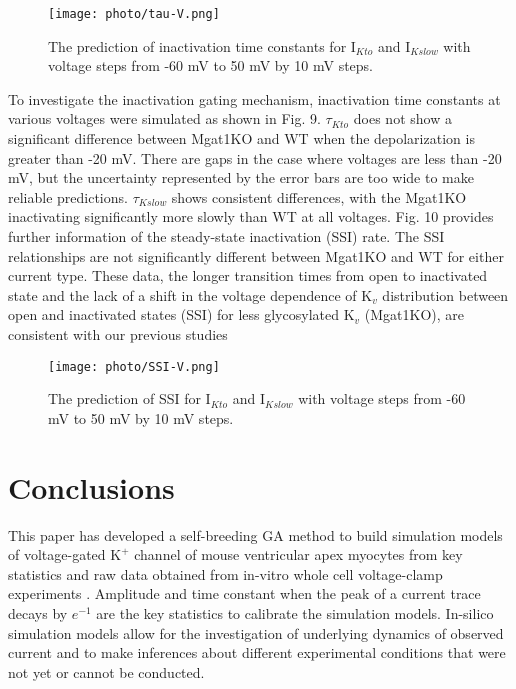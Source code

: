 \documentclass[journal]{IEEEtran}
\begin{document}
\begin{figure}
    \label{fign 9}
    \centering
    \texttt{[image: photo/tau-V.png]}
    \caption{The prediction of inactivation time constants for $\text{I}_{Kto}$ and $\text{I}_{Kslow}$ with voltage steps from -60 mV to 50 mV by 10 mV steps.} 
\end{figure}
To investigate the inactivation gating mechanism, inactivation time constants at various voltages were simulated as shown in Fig. 9. $\tau_{Kto}$ does not show a significant difference between Mgat1KO and WT when the depolarization is greater than -20 mV. There are gaps in the case where voltages are less than -20 mV, but the uncertainty represented by the error bars are too wide to make reliable predictions. $\tau_{Kslow}$ shows consistent differences, with the Mgat1KO inactivating significantly more slowly than WT at all voltages. Fig. 10 provides further information of the steady-state inactivation (SSI) rate. The SSI relationships are not significantly different between Mgat1KO and WT for either current type. These data, the longer transition times from open to inactivated state and the lack of a shift in the voltage dependence of $\text{K}_{v}$ distribution between open and inactivated states (SSI) for less glycosylated $\text{K}_{v}$ (Mgat1KO), are consistent with our previous studies \cite{schwetz2010n, ednie2015reduced, du2017}

\begin{figure}
    \label{fig 10}
    \centering
    \texttt{[image: photo/SSI-V.png]}
    \caption{The prediction of SSI for $\text{I}_{Kto}$ and $\text{I}_{Kslow}$ with voltage steps from -60 mV to 50 mV by 10 mV steps.} 
\end{figure}

\section{Conclusions}
This paper has developed a self-breeding GA method to build simulation models of voltage-gated $\text{K}^{+}$ channel of mouse ventricular apex myocytes from key statistics and raw data obtained from in-vitro whole cell voltage-clamp experiments \cite{ednie2019reduced}. Amplitude and time constant when the peak of a current trace decays by $e^{-1}$ are the key statistics to calibrate the simulation models. In-silico simulation models allow for the investigation of underlying dynamics of observed current and to make inferences about different experimental conditions that were not yet or cannot be conducted.
\end{document}
